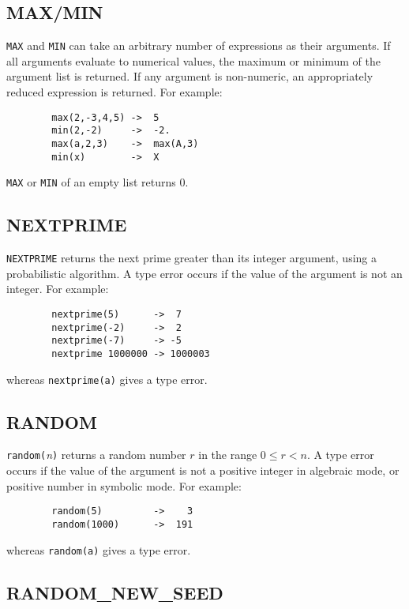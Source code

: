 \subsection{MAX/MIN}
\hypertarget{operator:MAX}{}
\hypertarget{operator:MIN}{}

\texttt{MAX} and \texttt{MIN} can take an arbitrary
number of expressions as their arguments.  If all arguments evaluate to
numerical values, the maximum or minimum of the argument list is returned.
If any argument is non-numeric, an appropriately reduced expression is
returned.  For example:
\begin{verbatim}
        max(2,-3,4,5) ->  5
        min(2,-2)     ->  -2.
        max(a,2,3)    ->  max(A,3)
        min(x)        ->  X
\end{verbatim}
\texttt{MAX} or \texttt{MIN} of an empty list returns 0.

\subsection{NEXTPRIME}
\hypertarget{operator:NEXTPRIME}{}

\texttt{NEXTPRIME} returns the next prime greater than its integer argument,
using a probabilistic algorithm.  A type error occurs if the value of the
argument is not an integer.  For example:
\begin{verbatim}
        nextprime(5)      ->  7
        nextprime(-2)     ->  2
        nextprime(-7)     -> -5
        nextprime 1000000 -> 1000003
\end{verbatim}
whereas \texttt{nextprime(a)} gives a type error.

\subsection{RANDOM}
\hypertarget{operator:RANDOM}{}

\texttt{random(}{\em n\/}\texttt{)} returns a random number $r$ in the
range $0\leq r < n$.  A type error occurs if the value of the argument is not a
positive integer in algebraic mode, or positive number in symbolic mode.
For example:
\begin{verbatim}
        random(5)         ->    3
        random(1000)      ->  191
\end{verbatim}
whereas \texttt{random(a)} gives a type error.

\subsection{RANDOM\_NEW\_SEED}
\hypertarget{operator:RANDOM_NEW_SEED}{}


